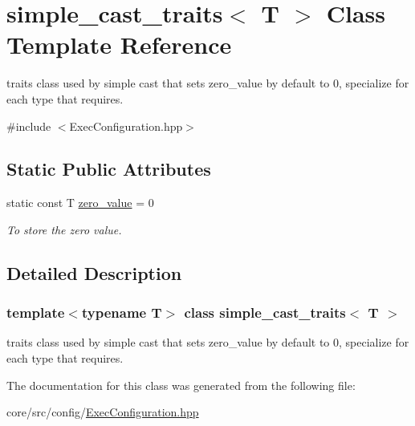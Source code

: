 \hypertarget{classsimple__cast__traits}{
\section{simple\_\-cast\_\-traits$<$ T $>$ Class Template Reference}
\label{classsimple__cast__traits}
}


traits class used by simple cast that sets zero\_\-value by default to 0, specialize for each type that requires.  




{\ttfamily \#include $<$ExecConfiguration.hpp$>$}

\subsection*{Static Public Attributes}
\begin{DoxyCompactItemize}
\item 
\hypertarget{classsimple__cast__traits_a69fa443539a4becd699563342d2f60ea}{
static const T \hyperlink{classsimple__cast__traits_a69fa443539a4becd699563342d2f60ea}{zero\_\-value} = 0}
\label{classsimple__cast__traits_a69fa443539a4becd699563342d2f60ea}

\begin{DoxyCompactList}\small\item\em To store the zero value. \item\end{DoxyCompactList}\end{DoxyCompactItemize}


\subsection{Detailed Description}
\subsubsection*{template$<$typename T$>$ class simple\_\-cast\_\-traits$<$ T $>$}

traits class used by simple cast that sets zero\_\-value by default to 0, specialize for each type that requires. 

The documentation for this class was generated from the following file:\begin{DoxyCompactItemize}
\item 
core/src/config/\hyperlink{ExecConfiguration_8hpp}{ExecConfiguration.hpp}\end{DoxyCompactItemize}
